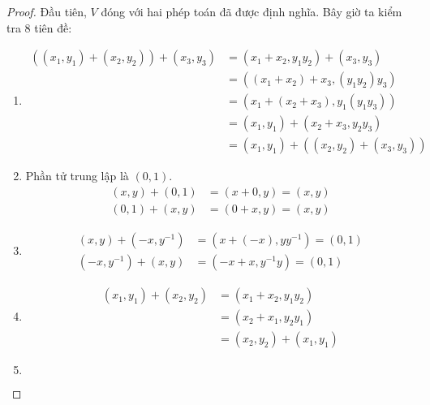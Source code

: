 \documentclass[class=linearalgebra,crop=false]{standalone}
\begin{document}
\begin{proof}Đầu tiên, $V$ đóng với hai phép toán đã được định nghĩa. Bây giờ ta kiểm tra 8 tiên đề:
    \begin{enumerate}[label = (V\arabic*)]
        \item
              \begin{align*}
                  ((x_{1}, y_{1}) + (x_{2}, y_{2})) + (x_{3}, y_{3}) & = (x_{1} + x_{2}, y_{1}y_{2}) + (x_{3}, y_{3})       \\
                                                                     & = ((x_{1} + x_{2}) + x_{3}, (y_{1}y_{2})y_{3})       \\
                                                                     & = (x_{1} + (x_{2} + x_{3}), y_{1}(y_{1}y_{3}))       \\
                                                                     & = (x_{1}, y_{1}) + (x_{2} + x_{3}, y_{2}y_{3})       \\
                                                                     & = (x_{1}, y_{1}) + ((x_{2}, y_{2}) + (x_{3}, y_{3}))
              \end{align*}
        \item Phần tử trung lập là $(0, 1)$.
              \begin{align*}
                  (x, y) + (0, 1) & = (x + 0, y) = (x, y) \\
                  (0, 1) + (x, y) & = (0 + x, y) = (x, y)
              \end{align*}
        \item
              \begin{align*}
                  (x, y) + (-x, y^{-1}) & = (x + (-x), yy^{-1}) = (0, 1) \\
                  (-x, y^{-1}) + (x, y) & = (-x + x, y^{-1}y) = (0, 1)
              \end{align*}
        \item
              \begin{align*}
                  (x_{1}, y_{1}) + (x_{2}, y_{2}) & = (x_{1} + x_{2}, y_{1}y_{2})     \\
                                                  & = (x_{2} + x_{1}, y_{2}y_{1})     \\
                                                  & = (x_{2}, y_{2}) + (x_{1}, y_{1})
              \end{align*}
        \item
              \begin{align*}

\end{align*}
\end{enumerate}
\end{proof}
\end{document}
